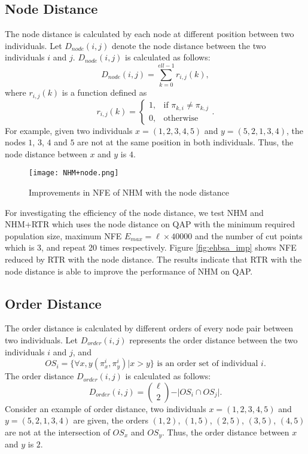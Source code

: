 \subsection*{Node Distance}
The node distance is calculated by each node at different position between two individuals. Let $D_{node} (i,j)$ denote the node distance between the two individuals $i$ and $j$. $D_{node} (i,j)$ is calculated as follows:\[D_{node} (i,j)=\sum_{k=0}^{ell-1} r_{i,j} (k), \]
where $r_{i,j} (k)$ is a function defined as \[r_{i,j} (k)=
\begin{cases}
1,  & \mbox{if }\pi_{k,i}\neq \pi_{k,j} \\
0, & \mbox{otherwise}
\end{cases}
.\] For example, given two individuals $x=(1,2,3,4,5)$ and $y=(5,2,1,3,4)$, the nodes $1$, $3$, $4$ and $5$ are not at the same position in both individuals. Thus, the node distance between $x$ and $y$ is $4$.



\begin{figure}[htbp] 
        \centering
        \texttt{[image: NHM+node.png]}
        \caption{ Improvements in NFE of NHM with the node distance } 
        \label{fig:nhbsa_imp}
\end{figure}


For investigating the efficiency of the node distance, we test NHM and NHM+RTR which uses the node distance on QAP with the minimum required population size, maximum NFE $E_{max} = \ell\times 40000$ and the number of cut points which is 3, and repeat 20 times respectively. Figure \ref{fig:ehbsa_imp} shows NFE reduced by RTR with the node distance. The results indicate that RTR with the node distance is able to improve the performance of NHM on QAP.



\subsection*{Order Distance}
The order distance is calculated by different orders of every node pair between two individuals. Let $D_{order} (i,j)$ represents the order distance between the two individuals $i$ and $j$, and \[OS_i=\lbrace\forall x,y(\pi_x^i,\pi_y^i)| x>y\rbrace\mbox{ is an order set of individual }i.\] The order distance $D_{order} (i,j)$ is calculated as follows:\[D_{order} (i,j)=\binom{\ell}{2}-\vert OS_i\cap OS_j\vert.\]
Consider an example of order distance, two individuals $x=(1,2,3,4,5)$ and $y=(5,2,1,3,4)$ are given, the orders $(1,2)$, $(1,5)$, $(2,5)$, $(3,5)$, $(4,5)$ are not at the intersection of $OS_x$ and $OS_y$. Thus, the order distance between $x$ and $y$ is $2$. 




